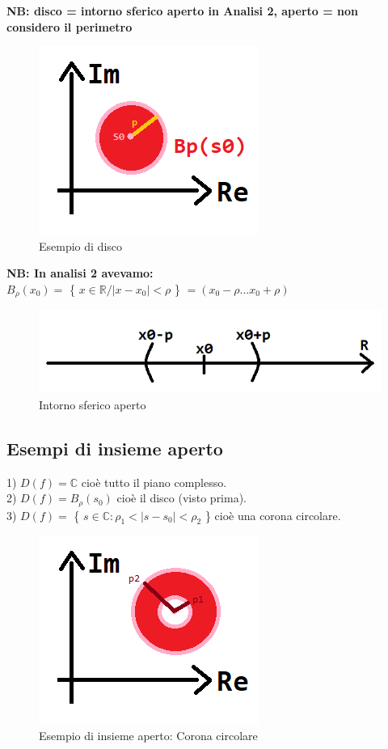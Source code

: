 \textbf{NB: disco = intorno sferico aperto in Analisi 2, aperto = non considero il perimetro}

\begin{figure}[h]
	\centering
	\includegraphics[scale=0.75]{immagini/disco}
	\caption{ Esempio di disco }
	\label{fig: esempioDisco}
\end{figure}


\textbf{NB: In analisi 2 avevamo: } \\
$ B_{\rho}(x_{0}) = $ \{ $ x \in \mathbb{R} / |x-x_{0}| < \rho $ \} $ = ( x_{0}-\rho ... x_{0}+\rho) $

\begin{figure}[h]
	\centering
	\includegraphics[scale=0.5]{immagini/intornoSfericoAperto}
	\caption{ Intorno sferico aperto }
	\label{fig: intornoSfericoAperto}
\end{figure}

\subsection*{Esempi di insieme aperto}
1) $ D(f) = \mathbb{C} $ cioè tutto il piano complesso.\\
2) $ D(f) = B_{\rho}(s_{0})$ cioè il disco (visto prima).\\
3) $ D(f) = $ \{ $ s \in \mathbb{C} : \rho_{1} < |s-s_{0}| < \rho_{2} $ \} cioè una corona circolare. \\
\begin{figure}[h]
	\centering
	\includegraphics[scale=0.75]{immagini/coronaCircolare}
	\caption{ Esempio di insieme aperto: Corona circolare }
	\label{fig: coronaCircolare}
\end{figure}

